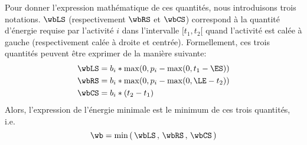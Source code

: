 Pour donner l'expression mathématique de ces quantités, nous
introduisons trois notations. $\wbLS$ (respectivement $\wbRS$ et
$\wbCS$) correspond à la quantité d'énergie requise par l'activité $i$
dans l'intervalle $[t_1,t_2[$  quand l'activité est calée à gauche
(respectivement calée à droite et centrée). Formellement, ces trois
quantités peuvent être exprimer de la manière suivante: 
\begin{align}
\wbLS&=b_i * \max(0,p_i- \max(0,t_1 - \ES)) \label{eq:LS_CUSP}\\
\wbRS&=b_i * \max(0,p_i- \max(0, \LE-t_2))\label{eq:RS_CUSP}\\
\wbCS&=b_i * (t_2-t_1)\label{eq:CS_CUSP}
\end{align}
Alors, l'expression de l'énergie minimale est le minimum de ces trois
quantités, i.e.
\begin{equation}
\wb=\min\left(\, \wbLS\, ,\,\wbRS\, ,\,\wbCS \, \right)
\end{equation} 


